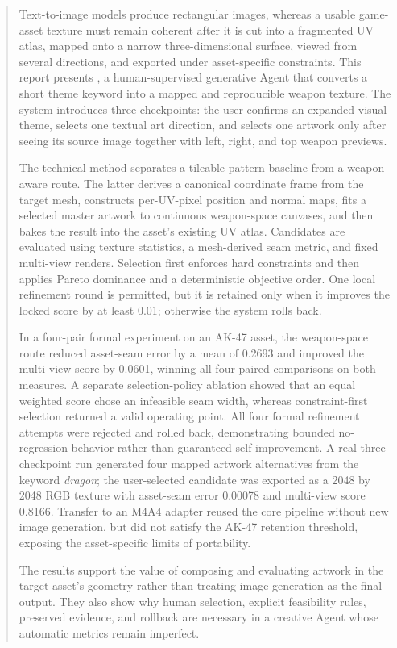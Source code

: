 \begin{abstract}
Text-to-image models produce rectangular images, whereas a usable game-asset
texture must remain coherent after it is cut into a fragmented UV atlas, mapped
onto a narrow three-dimensional surface, viewed from several directions, and
exported under asset-specific constraints. This report presents \skinsmith, a
human-supervised generative Agent that converts a short theme keyword into a
mapped and reproducible weapon texture. The system introduces three checkpoints:
the user confirms an expanded visual theme, selects one textual art direction,
and selects one artwork only after seeing its source image together with left,
right, and top weapon previews.

The technical method separates a tileable-pattern baseline from a weapon-aware
route. The latter derives a canonical coordinate frame from the target mesh,
constructs per-UV-pixel position and normal maps, fits a selected master artwork
to continuous weapon-space canvases, and then bakes the result into the asset's
existing UV atlas. Candidates are evaluated using texture statistics, a
mesh-derived seam metric, and fixed multi-view renders. Selection first enforces
hard constraints and then applies Pareto dominance and a deterministic objective
order. One local refinement round is permitted, but it is retained only when it
improves the locked score by at least 0.01; otherwise the system rolls back.

In a four-pair formal experiment on an AK-47 asset, the weapon-space route reduced
asset-seam error by a mean of 0.2693 and improved the multi-view score by 0.0601,
winning all four paired comparisons on both measures. A separate selection-policy
ablation showed that an equal weighted score chose an infeasible seam width,
whereas constraint-first selection returned a valid operating point. All four
formal refinement attempts were rejected and rolled back, demonstrating bounded
no-regression behavior rather than guaranteed self-improvement. A real
three-checkpoint run generated four mapped artwork alternatives from the keyword
\emph{dragon}; the user-selected candidate was exported as a 2048 by 2048 RGB
texture with asset-seam error 0.00078 and multi-view score 0.8166. Transfer to an
M4A4 adapter reused the core pipeline without new image generation, but did not
satisfy the AK-47 retention threshold, exposing the asset-specific limits of
portability.

The results support the value of composing and evaluating artwork in the target
asset's geometry rather than treating image generation as the final output. They
also show why human selection, explicit feasibility rules, preserved evidence,
and rollback are necessary in a creative Agent whose automatic metrics remain
imperfect.
\end{abstract}
